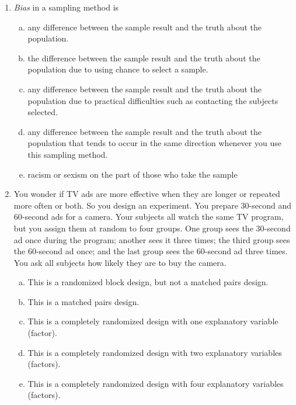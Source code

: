 \documentclass[a4paper,12pt,twoside]{book}
\begin{document}
\begin{enumerate}
  \item \textit{Bias} in a sampling method is  
      \begin{enumerate}[(a)]
          \item  any difference between the sample result and the truth about the population.
          \item  the difference between the sample result and the truth about the population due to using chance to select a sample.
          \item  any difference between the sample result and the truth about the population due to practical difficulties such as contacting the subjects selected.
          \item any difference between the sample result and the truth about the population that tends to occur in the same direction whenever you use this sampling method.
          \item  racism or sexism on the part of those who take the sample
      \end{enumerate}           

\item  You wonder if TV ads are more effective when they are longer or repeated more often or both. So you design an experiment. You prepare 30-second and 60-second ads for a camera. Your subjects all watch the same TV program, but you assign them at random to four groups. One group sees the 30-second ad once during the program; another sees it three times; the third group sees the 60-second ad once; and the last group sees the 60-second ad three times. You ask all subjects how likely they are to buy the camera.
   \begin{enumerate}[(a)]
       \item This is a randomized block design, but not a matched pairs design.
       \item  This is a matched pairs design.
       \item This is a completely randomized design with one explanatory variable (factor).
       \item  This is a completely randomized design with two explanatory variables (factors).
       \item  This is a completely randomized design with four explanatory variables (factors).
    \end{enumerate}            
              

\end{enumerate}
\end{document}
